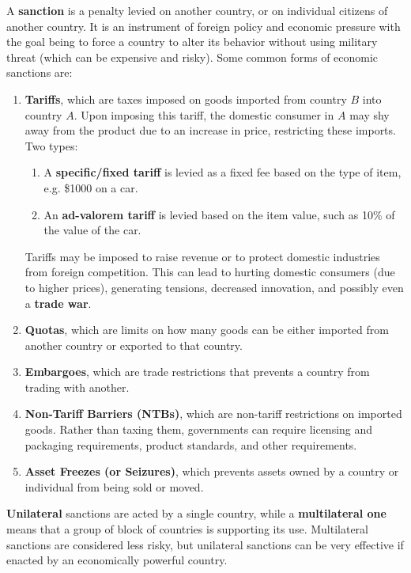 \documentclass{article}
\begin{document}
  \begin{definition}
    A \textbf{sanction} is a penalty levied on another country, or on individual citizens of another country. It is an instrument of foreign policy and economic pressure with the goal being to force a country to alter its behavior without using military threat (which can be expensive and risky). Some common forms of economic sanctions are: 
    \begin{enumerate}
        \item \textbf{Tariffs}, which are taxes imposed on goods imported from country $B$ into country $A$. Upon imposing this tariff, the domestic consumer in $A$ may shy away from the product due to an increase in price, restricting these imports. Two types: 
        \begin{enumerate}
            \item A \textbf{specific/fixed tariff} is levied as a fixed fee based on the type of item, e.g. \$1000 on a car. 
            \item An \textbf{ad-valorem tariff} is levied based on the item value, such as 10\% of the value of the car. 
        \end{enumerate}
        Tariffs may be imposed to raise revenue or to protect domestic industries from foreign competition. This can lead to hurting domestic consumers (due to higher prices), generating tensions, decreased innovation, and possibly even a \textbf{trade war}. 
        \item \textbf{Quotas}, which are limits on how many goods can be either imported from another country or exported to that country. 
        \item \textbf{Embargoes}, which are trade restrictions that prevents a country from trading with another. 
        \item \textbf{Non-Tariff Barriers (NTBs)}, which are non-tariff restrictions on imported goods. Rather than taxing them, governments can require licensing and packaging requirements, product standards, and other requirements. 
        \item \textbf{Asset Freezes (or Seizures)}, which prevents assets owned by a country or individual from being sold or moved. 
    \end{enumerate}
    \textbf{Unilateral} sanctions are acted by a single country, while a \textbf{multilateral one} means that a group of block of countries is supporting its use. Multilateral sanctions are considered less risky, but unilateral sanctions can be very effective if enacted by an economically powerful country. 
  \end{definition}
\end{document}
